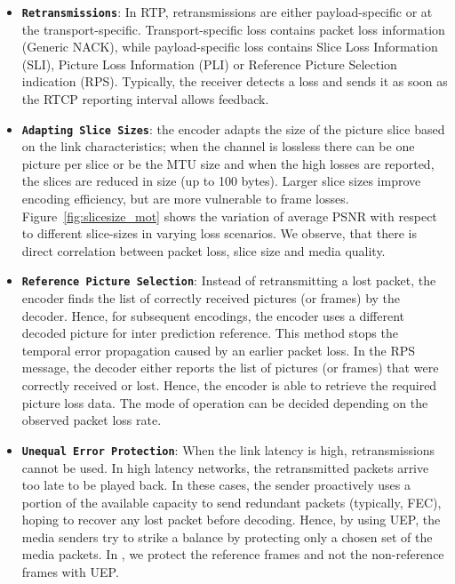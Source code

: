 \begin{itemize}
\setlength{\itemsep}{0pt}

  \item \textbf{\texttt{Retransmissions}}: In RTP, retransmissions are either
  payload-specific or at the transport-specific. Transport-specific loss
  contains packet loss information (Generic NACK), while payload-specific loss
  contains Slice Loss Information (SLI), Picture Loss Information (PLI) or
  Reference Picture Selection indication (RPS). Typically, the receiver
  detects a loss and sends it as soon as the RTCP reporting interval allows
  feedback.

  \item \textbf{\texttt{Adapting Slice Sizes}}: the encoder adapts the size of
  the picture slice based on the link characteristics; when the channel is
  lossless there can be one picture per slice or be the MTU size and when the
  high losses are reported, the slices are reduced in size (up to 100 bytes).
  Larger slice sizes improve encoding efficiency, but are more vulnerable to
  frame losses. Figure~\ref{fig:slicesize_mot} shows the variation of average
  PSNR with respect to different slice-sizes in varying loss scenarios. We
  observe, that there is direct correlation between packet loss, slice
  size and media quality.

  \item \textbf{\texttt{Reference Picture Selection}}: Instead of
  retransmitting a lost packet, the encoder finds the list of correctly
  received pictures (or frames) by the decoder. Hence, for subsequent encodings, the
  encoder uses a different decoded picture for inter prediction reference.
  This method stops the temporal error propagation caused by an earlier packet
  loss. In the RPS message, the decoder either reports the list of pictures (or frames)
  that were correctly received or lost. Hence, the encoder is able to retrieve
  the required picture loss data. The mode of operation can be decided
  depending on the observed packet loss rate.

  \item \textbf{\texttt{Unequal Error Protection}}: When the link latency is
  high, retransmissions cannot be used. In high latency networks, the
  retransmitted packets arrive too late to be played back. In these cases, the
  sender proactively uses a portion of the available capacity to send
  redundant packets (typically, FEC), hoping to recover any lost packet before
  decoding. Hence, by using UEP, the media senders try to strike a balance by
  protecting only a chosen set of the media packets. In , we
  protect the reference frames and not the non-reference frames with UEP.

\end{itemize}

